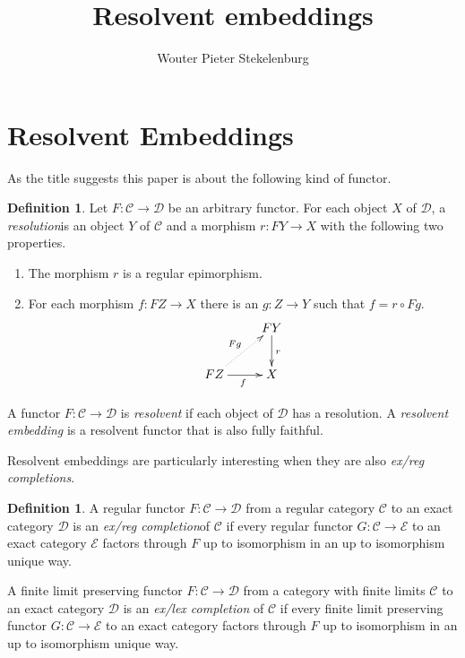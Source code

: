 \documentclass[sort&compress]{elsarticle}
\theoremstyle{plain}
\theoremstyle{definition}
\newtheorem{definition}[theorem]{Definition}
\theoremstyle{remark}
\newcommand\hide[1]{}
\newcommand\key[1]{\emph{#1}\label{#1}}
\newcommand\cat\mathcal
\newcommand\of:
\begin{document}
\begin{frontmatter}
\title{Resolvent embeddings}

\author[W. P. Stekelenburg]{Wouter Pieter Stekelenburg}
\address{Faculty of Mathematics, Informatics and Mechanics,
University of Warsaw,
Banacha 2,
02-097 Warszawa,
Poland}

\begin{abstract}
\end{abstract}

\begin{keyword}
\end{keyword}


\end{frontmatter}


\section{Resolvent Embeddings}
As the title suggests this paper is about the following kind of functor.

\begin{definition} Let $F\of \cat C\to\cat D$ be an arbitrary functor. For each object $X$ of $\cat D$, a \key{resolution} is an object $Y$ of $\cat C$ and a morphism $r\of FY \to X$ with the following two properties.
\begin{enumerate} 
\item The morphism $r$ is a regular epimorphism.
\item For each morphism $f\of FZ\to X$ there is an $g\of Z\to Y$ such that $f=r\circ Fg$. 
\[ \xymatrix{
& FY \ar[d]^{r} \\
FZ\ar[r]_f \ar@{.>}[ur]^{Fg} & X
}\]
\end{enumerate}
A functor $F:\cat C\to\cat D$ is \key{resolvent} if each object of $\cat D$ has a resolution. A \emph{resolvent embedding} is a resolvent functor that is also fully faithful.
\end{definition}

Resolvent embeddings are particularly interesting when they are also \emph{ex/reg completions}.

\begin{definition} A regular functor $F\of\cat C\to\cat D$ from a regular category $\cat C$ to an exact category $\cat D$ is an \key{ex/reg completion} of $\cat C$ if every regular functor $G\of \cat C\to\cat E$ to an exact category $\cat E$ factors through $F$ up to isomorphism in an up to isomorphism unique way.

A finite limit preserving functor $F\of\cat C\to\cat D$ from a category with finite limits $\cat C$ to an exact category $\cat D$ is an \key{ex/lex completion} of $\cat C$ if every finite limit preserving functor $G\of \cat C\to\cat E$ to an exact category factors through $F$ up to isomorphism in an up to isomorphism unique way.
\end{definition}\hide{It is clear that completions are fully faithful? How does this follow from the universal property?}
\end{document}
